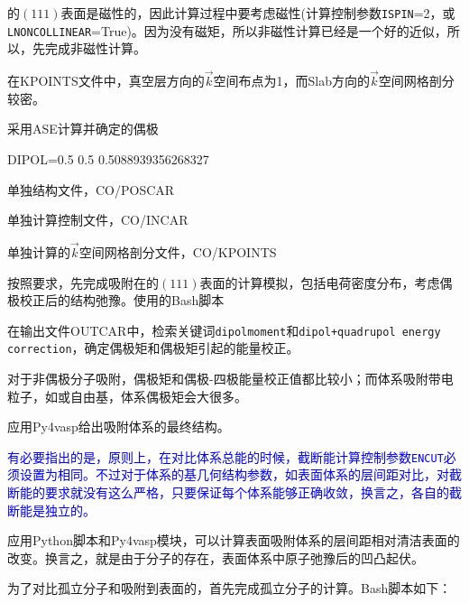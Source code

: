 
的$(111)$表面是磁性的，因此计算过程中要考虑磁性(计算控制参数\texttt{ISPIN}=2，或\texttt{LNONCOLLINEAR}=\textrm{True})。因为没有磁矩，所以非磁性计算已经是一个好的近似，所以，先完成非磁性计算。


在\textrm{KPOINTS}文件中，真空层方向的$\vec k$空间布点为1，而\textrm{Slab}方向的$\vec k$空间网格剖分较密。

采用\textrm{ASE}计算并确定的偶极

\textrm{DIPOL=0.5 0.5 0.5088939356268327}

单独结构文件，\textrm{CO/POSCAR}

单独计算控制文件，\textrm{CO/INCAR}

单独计算的$\vec k$空间网格剖分文件，\textrm{CO/KPOINTS}

按照要求，先完成吸附在的$(111)$表面的计算模拟，包括电荷密度分布，考虑偶极校正后的结构弛豫。使用的\textrm{Bash}脚本

在输出文件\textrm{OUTCAR}中，检索关键词\texttt{dipolmoment}和\texttt{dipol+quadrupol energy correction}，确定偶极矩和偶极矩引起的能量校正。

对于非偶极分子吸附，偶极矩和偶极-四极能量校正值都比较小；而体系吸附带电粒子，如或自由基，体系偶极矩会大很多。

应用\textrm{Py4vasp}给出吸附体系的最终结构。

\textcolor{blue}{有必要指出的是，原则上，在对比体系总能的时候，截断能计算控制参数\texttt{ENCUT}必须设置为相同。不过对于体系的基几何结构参数，如表面体系的层间距对比，对截断能的要求就没有这么严格，只要保证每个体系能够正确收敛，换言之，各自的截断能是独立的。}

应用\textrm{Python}脚本和\textrm{Py4vasp}模块，可以计算表面吸附体系的层间距相对清洁表面的改变。换言之，就是由于分子的存在，表面体系中原子弛豫后的凹凸起伏。

为了对比孤立分子和吸附到表面的，首先完成孤立分子的计算。\textrm{Bash}脚本如下：

